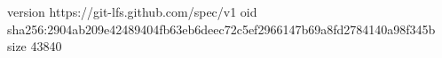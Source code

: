 version https://git-lfs.github.com/spec/v1
oid sha256:2904ab209e42489404fb63eb6deec72c5ef2966147b69a8fd2784140a98f345b
size 43840
